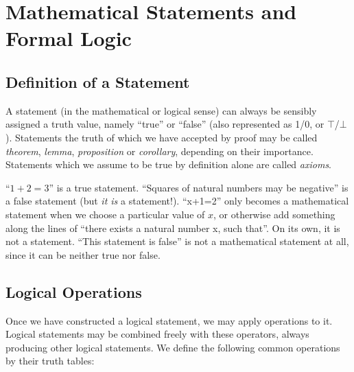\chapter{Mathematical Statements and Formal Logic}\label{ch:statements}
\section{Definition of a Statement}

\begin{definition}
  A statement (in the mathematical or logical sense) can always be sensibly
  assigned a truth value, namely ``true'' or ``false'' (also represented as 1/0,
  or \(\top\)/\(\bot\)).
  Statements the truth of which we have accepted by proof may be called
  \emph{theorem}, \emph{lemma}, \emph{proposition} or \emph{corollary},
  depending on their importance.
  Statements which we assume to be true by definition alone are called
  \emph{axioms}.
\end{definition}

\begin{example}
  \begin{itemize}
    \leavevmode
    \ii{} ``\(1+2=3\)'' is a true statement.
    \ii{} ``Squares of natural numbers may be negative'' is a false statement
          (but \emph{it is} a statement!).
    \ii{} ``x+1=2'' only becomes a mathematical statement when we choose a
          particular value of \(x\), or otherwise add something along the lines
          of ``there exists a natural number x, such that''. On its own, it is
          not a statement.
   \ii{} ``This statement is false'' is not a mathematical statement at all,
          since it can be neither true nor false.
  \end{itemize}
\end{example}

\section{Logical Operations}
Once we have constructed a logical statement, we may apply operations to it.
Logical statements may be combined freely with these operators, always producing
other logical statements. We define the following common operations by their
truth tables:

